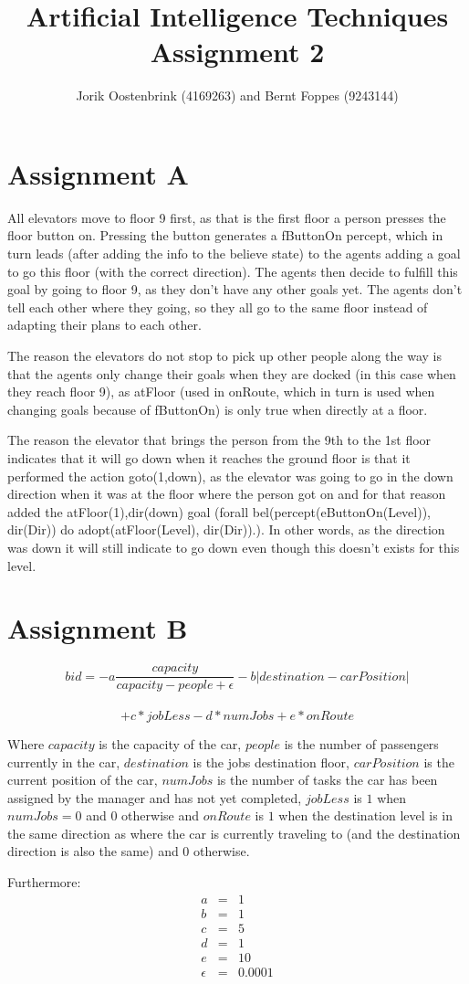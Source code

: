 \documentclass[a4paper,11pt]{article}
\title{Artificial Intelligence Techniques Assignment 2}
\author{Jorik Oostenbrink (4169263) and Bernt Foppes (9243144)}
\date{}
\begin{document}
\maketitle	

\section{Assignment A}
All elevators move to floor 9 first, as that is the first floor a person presses the floor button on. Pressing the button generates a fButtonOn percept, which in turn leads (after adding the info to the believe state) to the agents adding a goal to go this floor (with the correct direction). The agents then decide to fulfill this goal by going to floor 9, as they don't have any other goals yet. The agents don't tell each other where they going, so they all go to the same floor instead of adapting their plans to each other.

The reason the elevators do not stop to pick up other people along the way is that the agents only change their goals when they are docked (in this case when they reach floor 9), as atFloor (used in onRoute, which in turn is used when changing goals because of fButtonOn) is only true when directly at a floor.

The reason the elevator that brings the person from the 9th to the 1st floor indicates that it will go down when it reaches the ground floor is that it performed the action goto(1,down), as the elevator was going to go in the down direction when it was at the floor where the person got on and for that reason added the atFloor(1),dir(down) goal (forall bel(percept(eButtonOn(Level)), dir(Dir)) do adopt(atFloor(Level), dir(Dir)).). In other words, as the direction was down it will still indicate to go down even though this doesn't exists for this level.

\section{Assignment B}

\[bid = -a\frac{capacity}{capacity-people+\epsilon} - b|destination - carPosition|\]\\ \[+ c*jobLess - d*numJobs + e*onRoute\]

Where $capacity$ is the capacity of the car, $people$ is the number of passengers currently in the car, $destination$ is the jobs destination floor, $carPosition$ is the current position of the car, $numJobs$ is the number of tasks the car has been assigned by the manager and has not yet completed, $jobLess$ is $1$ when $numJobs = 0$  and $0$ otherwise and $onRoute$ is $1$ when the destination level is in the same direction as where the car is currently traveling to (and the destination direction is also the same) and $0$ otherwise.

Furthermore: \[\begin{array}{lcl}
a & = & 1\\
b & = & 1\\
c & = & 5\\
d & = & 1\\
e & = & 10\\
\epsilon & = & 0.0001
\end{array}\]
\end{document}
